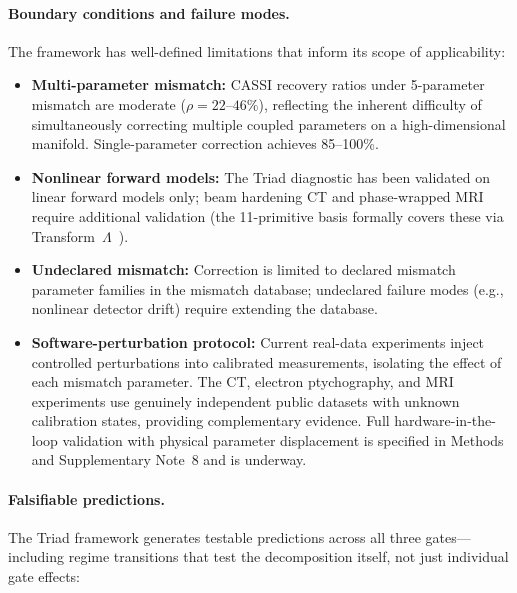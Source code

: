 \documentclass[11pt]{article}
\newcommand{\recoveryratio}{\rho}
\begin{document}
\paragraph{Boundary conditions and failure modes.}
The framework has well-defined limitations that inform its scope of applicability:
\begin{itemize}
\item \textbf{Multi-parameter mismatch:} CASSI recovery ratios under 5-parameter mismatch are moderate ($\recoveryratio = 22$--$46\%$), reflecting the inherent difficulty of simultaneously correcting multiple coupled parameters on a high-dimensional manifold. Single-parameter correction achieves 85--100\%.
\item \textbf{Nonlinear forward models:} The Triad diagnostic has been validated on linear forward models only; beam hardening CT and phase-wrapped MRI require additional validation (the 11-primitive basis formally covers these via Transform~$\Lambda$~\cite{yang2026fpt}).
\item \textbf{Undeclared mismatch:} Correction is limited to declared mismatch parameter families in the mismatch database; undeclared failure modes (e.g., nonlinear detector drift) require extending the database.
\item \textbf{Software-perturbation protocol:} Current real-data experiments inject controlled perturbations into calibrated measurements, isolating the effect of each mismatch parameter. The CT, electron ptychography, and MRI experiments use genuinely independent public datasets with unknown calibration states, providing complementary evidence. Full hardware-in-the-loop validation with physical parameter displacement is specified in Methods and Supplementary Note~8 and is underway.
\end{itemize}

\paragraph{Falsifiable predictions.}
The Triad framework generates testable predictions across all three gates---including regime transitions that test the decomposition itself, not just individual gate effects:
\end{document}
